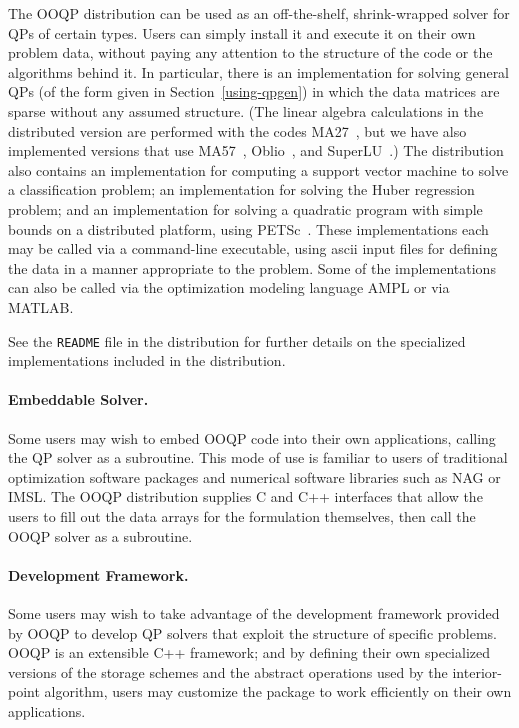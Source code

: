 The OOQP distribution can be used as an off-the-shelf, shrink-wrapped
solver for QPs of certain types. Users can simply install it and
execute it on their own problem data, without paying any attention to
the structure of the code or the algorithms behind it. In particular,
there is an implementation for solving general QPs (of the form
 given in Section~\ref{using-qpgen}) in which the data
matrices are sparse without any assumed structure. (The linear algebra
calculations in the distributed version are performed with the codes
MA27~\cite{duff82ma27}, but we have also implemented versions that use
MA57~\cite{hsl2000}, Oblio~\cite{DobP00}, and SuperLU~\cite{DemGL99}.)
The distribution also contains an implementation for computing a
support vector machine to solve a classification problem; an
implementation for solving the Huber regression problem; and an
implementation for solving a quadratic program with simple bounds on a
distributed platform, using PETSc~\cite{petsc-manual}. These implementations
each may be called via a command-line executable, using ascii input
files for defining the data in a manner appropriate to the problem.
Some of the implementations can also be called via the optimization
modeling language AMPL or via MATLAB.

See the \verb-README- file in the distribution for further details on
the specialized implementations included in the distribution.

\paragraph{Embeddable Solver.}

Some users may wish to embed OOQP code into their own applications,
calling the QP solver as a subroutine. This mode of use is familiar to
users of traditional optimization software packages and numerical
software libraries such as NAG or IMSL. The OOQP distribution supplies
C and C++ interfaces that allow the users to fill out the data arrays
for the formulation  themselves, then call the OOQP
solver as a subroutine.

\paragraph{Development Framework.}

Some users may wish to take advantage of the development framework
provided by OOQP to develop QP solvers that exploit the structure of
specific problems. OOQP is an extensible C++ framework; and by
defining their own specialized versions of the storage schemes and the
abstract operations used by the interior-point algorithm, users may
customize the package to work efficiently on their own applications.

